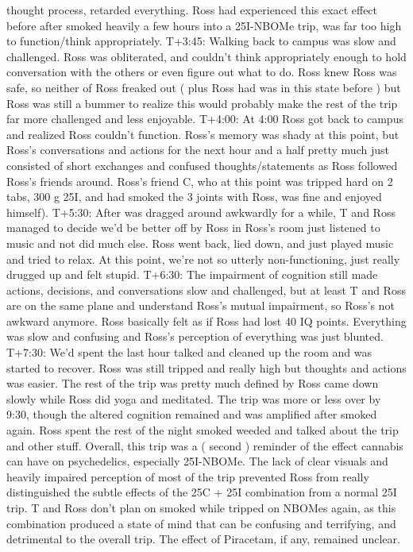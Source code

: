 \documentclass[12pt]{book}
\begin{document}
thought process, retarded everything. Ross had experienced this exact effect before after smoked heavily a few hours into a 25I-NBOMe trip, was far too high to function/think appropriately. T+3:45: Walking back to campus was slow and challenged. Ross was obliterated, and couldn't think appropriately enough to hold conversation with the others or even figure out what to do. Ross knew Ross was safe, so neither of Ross freaked out ( plus Ross had was in this state before ) but Ross was still a bummer to realize this would probably make the rest of the trip far more challenged and less enjoyable. T+4:00: At 4:00 Ross got back to campus and realized Ross couldn't function. Ross's memory was shady at this point, but Ross's conversations and actions for the next hour and a half pretty much just consisted of short exchanges and confused thoughts/statements as Ross followed Ross's friends around. Ross's friend C, who at this point was tripped hard on 2 tabs, 300 g 25I, and had smoked the 3 joints with Ross, was fine and enjoyed himself). T+5:30: After was dragged around awkwardly for a while, T and Ross managed to decide we'd be better off by Ross in Ross's room just listened to music and not did much else. Ross went back, lied down, and just played music and tried to relax. At this point, we're not so utterly non-functioning, just really drugged up and felt stupid. T+6:30: The impairment of cognition still made actions, decisions, and conversations slow and challenged, but at least T and Ross are on the same plane and understand Ross's mutual impairment, so Ross's not awkward anymore. Ross basically felt as if Ross had lost 40 IQ points. Everything was slow and confusing and Ross's perception of everything was just blunted. T+7:30: We'd spent the last hour talked and cleaned up the room and was started to recover. Ross was still tripped and really high but thoughts and actions was easier. The rest of the trip was pretty much defined by Ross came down slowly while Ross did yoga and meditated. The trip was more or less over by 9:30, though the altered cognition remained and was amplified after smoked again. Ross spent the rest of the night smoked weeded and talked about the trip and other stuff. Overall, this trip was a ( second ) reminder of the effect cannabis can have on psychedelics, especially 25I-NBOMe. The lack of clear visuals and heavily impaired perception of most of the trip prevented Ross from really distinguished the subtle effects of the 25C + 25I combination from a normal 25I trip. T and Ross don't plan on smoked while tripped on NBOMes again, as this combination produced a state of mind that can be confusing and terrifying, and detrimental to the overall trip. The effect of Piracetam, if any, remained unclear.
\end{document}
